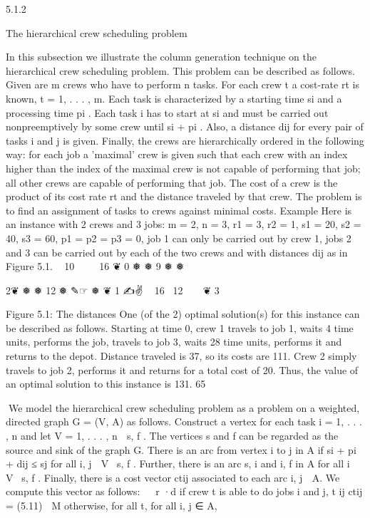 5.1.2

The hierarchical crew scheduling problem

In this subsection we illustrate the column generation technique on the hierarchical crew scheduling
problem. This problem can be described as follows. Given are m crews who have to perform n tasks.
For each crew t a cost-rate rt is known, t = 1, . . . , m. Each task is characterized by a starting time si
and a processing time pi . Each task i has to start at si and must be carried out nonpreemptively by
some crew until si + pi . Also, a distance dij for every pair of tasks i and j is given. Finally, the crews are
hierarchically ordered in the following way: for each job a 'maximal' crew is given such that each crew
with an index higher than the index of the maximal crew is not capable of performing that job; all other
crews are capable of performing that job. The cost of a crew is the product of its cost rate rt and the
distance traveled by that crew. The problem is to find an assignment of tasks to crews against minimal
costs.
Example Here is an instance with 2 crews and 3 jobs:
m = 2, n = 3, r1 = 3, r2 = 1, s1 = 20, s2 = 40, s3 = 60, p1 = p2 = p3 = 0,
job 1 can only be carried out by crew 1, jobs 2 and 3 can be carried out by each of the two crews and
with distances dij as in Figure 5.1.
 
10 
 
  16
❦
0
❅
❅
9
❅
❅

2❦
❅
❅ 12
❅ ✎☞
❅ ❦
1
✍✌
 
16  12
 
 
❦
3

Figure 5.1: The distances
One (of the 2) optimal solution(s) for this instance can be described as follows. Starting at time 0, crew
1 travels to job 1, waits 4 time units, performs the job, travels to job 3, waits 28 time units, performs it
and returns to the depot. Distance traveled is 37, so its costs are 111. Crew 2 simply travels to job 2,
performs it and returns for a total cost of 20. Thus, the value of an optimal solution to this instance is
131.
65

We model the hierarchical crew scheduling problem as a problem on a weighted, directed graph G = (V, A)
as follows. Construct a vertex for each task i = 1, . . . , n and let V = {1, . . . , n} ∪ {s, f }. The vertices s
and f can be regarded as the source and sink of the graph G. There is an arc from vertex i to j in A if
si + pi + dij ≤ sj for all i, j ∈ V \ {s, f }. Further, there is an arc {s, i} and {i, f } in A for all i ∈ V \ {s, f }.
Finally, there is a cost vector ctij associated to each arc {i, j} ∈ A. We compute this vector as follows:

 r ·d
if crew t is able to do jobs i and j,
t
ij
ctij =
(5.11)
 M
otherwise, for all t, for all {i, j} ∈ A,

